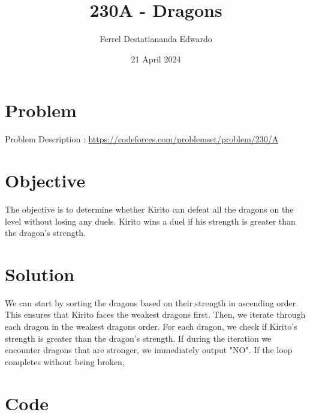 \documentclass{article}
\title{230A - Dragons}
\author{Ferrel Destatiananda Edwardo}
\date{21 April 2024}
\begin{document}
\maketitle


\section{Problem}

Problem Description : \href{https://codeforces.com/problemset/problem/230/A}{https://codeforces.com/problemset/problem/230/A}

\section{Objective}

The objective is to determine whether Kirito can defeat all the dragons on the level without losing any duels. Kirito wins a duel if his strength is greater than the dragon's strength.

\section{Solution}

We can start by sorting the dragons based on their strength in ascending order. This ensures that Kirito faces the weakest dragons first. Then, we iterate through each dragon in the weakest dragons order. For each dragon, we check if Kirito's strength is greater than the dragon's strength. If during the iteration we encounter dragons that are stronger, we immediately output "NO". If the loop completes without being broken, 


\newpage
\section{Code}
\end{document}
